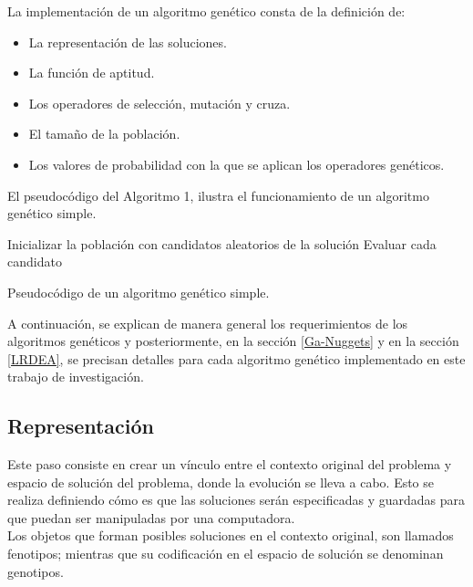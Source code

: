 La implementación de un algoritmo genético consta de la definición de:

\begin{itemize}
	\item La representación de las soluciones.
	\item La función de aptitud.
	\item Los operadores de selección, mutación y cruza.
	\item El tamaño de la población.
	\item Los valores de probabilidad con la que se aplican los operadores genéticos.
\end{itemize}

El pseudocódigo del Algoritmo 1, ilustra el funcionamiento de un algoritmo genético simple.
\\

\begin{algorithm}[h] 
	
	\SetAlgoLined
	Inicializar la población con candidatos aleatorios de la solución\;
	Evaluar cada candidato\;
	
	\caption{Pseudocódigo de un algoritmo genético simple.}
\end{algorithm}


A continuación, se explican de manera general los requerimientos de los algoritmos genéticos y posteriormente, en la sección \ref{Ga-Nuggets} y en la sección \ref{LRDEA}, se precisan detalles para cada algoritmo genético implementado en este trabajo de investigación.

\subsection{Representación}

Este paso consiste en crear un vínculo entre el contexto original del problema y espacio de solución del problema, donde la evolución se lleva a cabo. Esto se realiza definiendo cómo es que las soluciones serán especificadas y guardadas para que puedan ser manipuladas por una computadora.
\\

Los objetos que forman posibles soluciones en el contexto original, son llamados fenotipos; mientras que su codificación en el espacio de solución se denominan genotipos.

